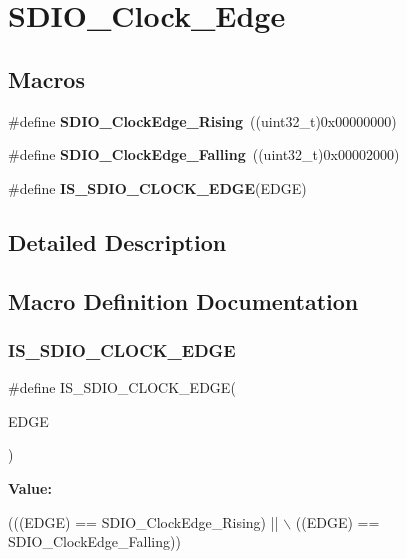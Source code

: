 \section{S\+D\+I\+O\+\_\+\+Clock\+\_\+\+Edge}
\label{group__SDIO__Clock__Edge}
\subsection*{Macros}
\begin{DoxyCompactItemize}
\item 
\#define \textbf{ S\+D\+I\+O\+\_\+\+Clock\+Edge\+\_\+\+Rising}~((uint32\+\_\+t)0x00000000)
\item 
\#define \textbf{ S\+D\+I\+O\+\_\+\+Clock\+Edge\+\_\+\+Falling}~((uint32\+\_\+t)0x00002000)
\item 
\#define \textbf{ I\+S\+\_\+\+S\+D\+I\+O\+\_\+\+C\+L\+O\+C\+K\+\_\+\+E\+D\+GE}(E\+D\+GE)
\end{DoxyCompactItemize}


\subsection{Detailed Description}


\subsection{Macro Definition Documentation}
\mbox{\label{group__SDIO__Clock__Edge_ga63420b10a52e3d82a89a45f20dc41786}} 
\subsubsection{I\+S\+\_\+\+S\+D\+I\+O\+\_\+\+C\+L\+O\+C\+K\+\_\+\+E\+D\+GE}
{\footnotesize\ttfamily \#define I\+S\+\_\+\+S\+D\+I\+O\+\_\+\+C\+L\+O\+C\+K\+\_\+\+E\+D\+GE(\begin{DoxyParamCaption}\item[{}]{E\+D\+GE }\end{DoxyParamCaption})}

{\bfseries Value\+:}
\begin{DoxyCode}
(((EDGE) == SDIO_ClockEdge_Rising) || \(\backslash\)
                                  ((EDGE) == SDIO_ClockEdge_Falling))
\end{DoxyCode}


